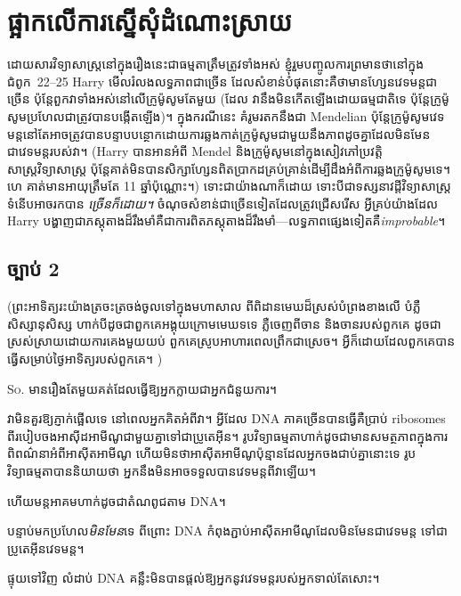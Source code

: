 \chapter{ផ្អាកលើការស្នើសុំដំណោះស្រាយ}

\begin{chapterOpeningAuthorNote}
ដោយសារវិទ្យាសាស្រ្តនៅក្នុងរឿងនេះជាធម្មតាត្រឹមត្រូវទាំងអស់ ខ្ញុំរួមបញ្ចូលការព្រមានថានៅក្នុងជំពូក~22–25 Harry មើលរំលងលទ្ធភាពជាច្រើន ដែលសំខាន់បំផុតនោះគឺថាមានហ្សែនវេទមន្តជាច្រើន ប៉ុន្តែពួកវាទាំងអស់នៅលើក្រូម៉ូសូមតែមួយ (ដែល វា​នឹង​មិន​កើត​ឡើង​ដោយ​ធម្មជាតិ​ទេ ប៉ុន្តែ​ក្រូម៉ូសូម​ប្រហែល​ជា​ត្រូវ​បាន​បង្កើត​ឡើង​)។ ក្នុងករណីនេះ គំរូមរតកនឹងជា Mendelian ប៉ុន្តែក្រូម៉ូសូមវេទមន្តនៅតែអាចត្រូវបានបន្ទាបបន្ថោកដោយការឆ្លងកាត់ក្រូម៉ូសូមជាមួយនឹងភាពដូចគ្នាដែលមិនមែនជាវេទមន្តរបស់វា។ (Harry បានអានអំពី Mendel និងក្រូម៉ូសូមនៅក្នុងសៀវភៅប្រវត្តិសាស្រ្តវិទ្យាសាស្ត្រ ប៉ុន្តែគាត់មិនបានសិក្សាហ្សែនពិតប្រាកដគ្រប់គ្រាន់ដើម្បីដឹងអំពីការឆ្លងក្រូម៉ូសូមទេ។ ហេ គាត់មានអាយុត្រឹមតែ 11 ឆ្នាំប៉ុណ្ណោះ។) ទោះជាយ៉ាងណាក៏ដោយ ទោះបីជាទស្សនាវដ្តីវិទ្យាសាស្ត្រទំនើបអាចរកបាន \emph{ច្រើនក៏ដោយ។ } ចំណុចសំខាន់ជាច្រើនទៀតដែលត្រូវជ្រើសរើស អ្វីគ្រប់យ៉ាងដែល Harry បង្ហាញជាភស្តុតាងដ៏រឹងមាំគឺជាការពិតភស្តុតាងដ៏រឹងមាំ—លទ្ធភាពផ្សេងទៀតគឺ\emph{improbable}។
\end{chapterOpeningAuthorNote}

\section{ច្បាប់ 2}

(ព្រះអាទិត្យរះយ៉ាងត្រចះត្រចង់ចូលទៅក្នុងមហាសាល ពីពិដានមេឃដ៏ស្រស់បំព្រងខាងលើ បំភ្លឺសិស្សានុសិស្ស ហាក់បីដូចជាពួកគេអង្គុយក្រោមមេឃទទេ ភ្លឺចេញពីចាន និងចានរបស់ពួកគេ ដូចជា ស្រស់ស្រាយដោយការគេងមួយយប់ ពួកគេស្រូបអាហារពេលព្រឹកជាស្រេច។ អ្វីក៏ដោយដែលពួកគេបានធ្វើសម្រាប់ថ្ងៃអាទិត្យរបស់ពួកគេ។ )

\lettrine{S}{o.} មានរឿងតែមួយគត់ដែលធ្វើឱ្យអ្នកក្លាយជាអ្នកជំនួយការ។

វាមិនគួរឱ្យភ្ញាក់ផ្អើលទេ នៅពេលអ្នកគិតអំពីវា។ អ្វីដែល DNA ភាគច្រើនបានធ្វើគឺប្រាប់ ribosomes ពីរបៀបចងអាស៊ីដអាមីណូជាមួយគ្នាទៅជាប្រូតេអ៊ីន។ រូបវិទ្យាធម្មតាហាក់ដូចជាមានសមត្ថភាពក្នុងការពិពណ៌នាអំពីអាស៊ីតអាមីណូ ហើយមិនថាអាស៊ីតអាមីណូប៉ុន្មានដែលអ្នកចងជាប់គ្នានោះទេ រូបវិទ្យាធម្មតាបាននិយាយថា អ្នកនឹងមិនអាចទទួលបានវេទមន្តពីវាឡើយ។

ហើយ​មន្តអាគម​ហាក់​ដូច​ជា​តំណពូជ​តាម DNA។

បន្ទាប់មកប្រហែល\emph{មិនមែន}ទេ ពីព្រោះ DNA កំពុងភ្ជាប់អាស៊ីតអាមីណូដែលមិនមែនជាវេទមន្ត ទៅជាប្រូតេអ៊ីនវេទមន្ត។

ផ្ទុយទៅវិញ លំដាប់ DNA គន្លឹះមិនបានផ្តល់ឱ្យអ្នកនូវវេទមន្តរបស់អ្នកទាល់តែសោះ។

